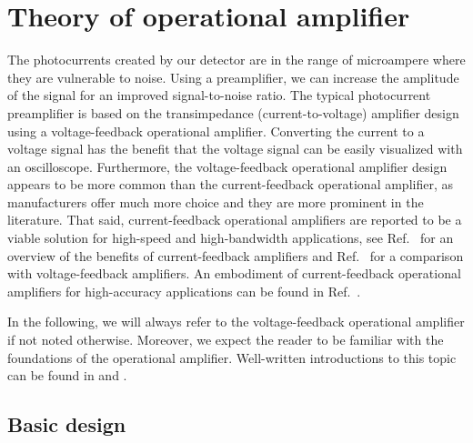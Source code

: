\section{Theory of operational amplifier}

The photocurrents created by our detector are in the range of microampere where they are vulnerable to noise.
Using a preamplifier, we can increase the amplitude of the signal for an improved signal-to-noise ratio.
The typical photocurrent preamplifier is based on the transimpedance (current-to-voltage) amplifier design using a voltage-feedback operational amplifier.
Converting the current to a voltage signal has the benefit that the voltage signal can be easily visualized with an oscilloscope.
Furthermore, the voltage-feedback operational amplifier design appears to be more common than the current-feedback operational amplifier, as manufacturers offer much more choice and they are more prominent in the literature.
That said, current-feedback operational amplifiers are reported to be a viable solution for high-speed and high-bandwidth applications, see Ref.~\cite[p.~110]{Jung05} for an overview of the benefits of current-feedback amplifiers and Ref.~\cite[Ch.~9]{Carter17} for a comparison with voltage-feedback amplifiers.
An embodiment of current-feedback operational amplifiers for high-accuracy applications can be found in Ref.~\cite[p.~143]{Noorlag74}.

In the following, we will always refer to the voltage-feedback operational amplifier if not noted otherwise.
Moreover, we expect the reader to be familiar with the foundations of the operational amplifier.
Well-written introductions to this topic can be found in \cite[Ch.~1]{Jung05} and \cite[Ch.~3]{Carter17}.

\subsection{Basic design}

